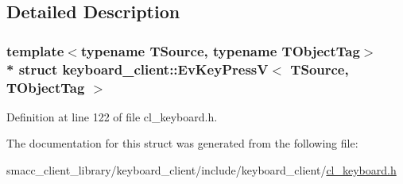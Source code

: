 \subsection{Detailed Description}
\subsubsection*{template$<$typename T\+Source, typename T\+Object\+Tag$>$\\*
struct keyboard\+\_\+client\+::\+Ev\+Key\+Press\+V$<$ T\+Source, T\+Object\+Tag $>$}



Definition at line 122 of file cl\+\_\+keyboard.\+h.



The documentation for this struct was generated from the following file\+:\begin{DoxyCompactItemize}
\item 
smacc\+\_\+client\+\_\+library/keyboard\+\_\+client/include/keyboard\+\_\+client/\hyperlink{cl__keyboard_8h}{cl\+\_\+keyboard.\+h}\end{DoxyCompactItemize}
